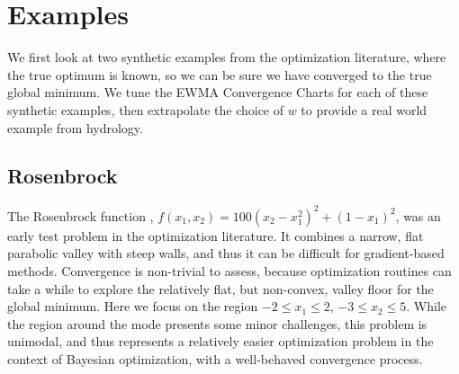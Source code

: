 \documentclass{article}
\begin{document}
\section{Examples}
\label{sec:examples}
%
We first look at two synthetic examples from the optimization literature, 
where the true optimum is known, so we can be sure we have converged to the 
true global minimum. We tune the EWMA Convergence Charts for each of these 
synthetic examples, then extrapolate the choice of $w$ to provide a real world 
example from hydrology.

%
%
\subsection{Rosenbrock}
%
%


%
The Rosenbrock function \citep{rosePaper}, $f(x_1, x_2) =
100\left(x_2-x_1^2\right)^2 + (1-x_1)^2$,  was an early test problem in the 
optimization literature. It combines a narrow, flat parabolic valley with 
steep walls, and thus it can be difficult for gradient-based
methods. Convergence is non-trivial to assess, because optimization
routines can  
take a while to explore the relatively flat, but non-convex, valley floor for 
the global minimum. Here we focus on the region $-2\le x_1\le2$, 
$-3\le x_2\le5$. While the region around the mode presents some minor 
challenges, this problem is unimodal, and thus represents a relatively easier 
optimization problem in the context of Bayesian optimization, with 
a well-behaved convergence process.
\end{document}
